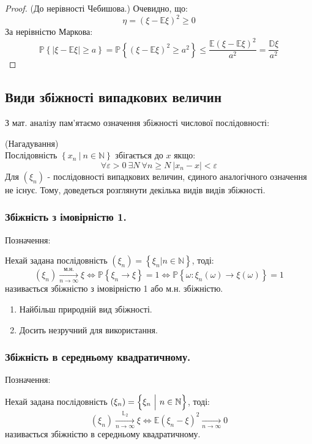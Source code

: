 \begin{proof}(До нерівності Чебишова.) Очевидно, що:
$$
\eta = \left( \xi - \mathbb{E} \xi \right)^2 \geq 0
$$
 За нерівністю Маркова:
 $$
  \mathbb{P} \left\lbrace \left| \xi - \mathbb{E} \xi \right| \geq a  \right\rbrace=\mathbb{P} \left\lbrace  (\xi - \mathbb{E} \xi)^2 \geq a^2 \right\rbrace \leq \frac{\mathbb{E} \left( \xi - \mathbb{E} \xi \right)^2}{a^2} = \frac{\mathbb{D}\xi}{a^2}
 $$
\end{proof}
\newpage
\subsection{Види збіжності випадкових величин}
З мат. аналізу пам'ятаємо означення збіжності числової послідовності:
\begin{defo} (Нагадування) \\
 Послідовність $ \left\lbrace x_n\ \Big|\  n\in \mathbb{N} \right\rbrace$ збігається до $x$ якщо:
 $$
 \forall \varepsilon >0 \ \exists N \ \forall n\geq N \ |x_n - x| < \varepsilon
 $$
Для $(\xi_n)$ - послідовності випадкових величин, єдиного аналогічного означення не існує. Тому, доведеться розглянути декілька видів видів збіжності.
\end{defo}
\subsubsection{Збіжність з імовірністю 1.}
Позначення: 
\begin{defo} Нехай задана послідовність $(\xi_n) = \left\lbrace \xi_n \Big| n \in \mathbb{N} \right\rbrace$, тоді:
 $$
 (\xi_n) \xrightarrow[n \to \infty]{\text{м.н.}} \xi \Longleftrightarrow \mathbb{P} \left\lbrace \xi_n \to \xi \right\rbrace = 1 \Longleftrightarrow \mathbb{P} \left\lbrace \omega : \xi_n (\omega) \to \xi(\omega) \right\rbrace = 1
 $$
 називається збіжністю з імовірністю 1 або м.н. збіжністю.
 \begin{enumerate}
     \item Найбільш природній вид збіжності.
     \item Досить незручний для використання.
 \end{enumerate}
\end{defo}
\subsubsection{Збіжність в середньому квадратичному.}
Позначення: 
\begin{defo} Нехай задана послідовність $(\xi_n) = \left\lbrace \xi_n \ \Big|\  n \in \mathbb{N} \right\rbrace$, тоді:
  $$
  (\xi_n) \xrightarrow[n \to \infty]{\mathbb{L}_2}\xi \Longleftrightarrow \mathbb{E} \left( \xi_n - \xi \right)^2 \xrightarrow[n \to \infty]{} 0
  $$
  називається збіжністю в середньому квадратичному.
\end{defo}
